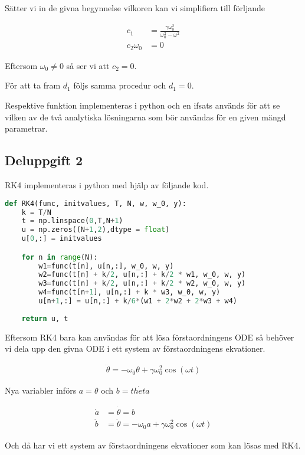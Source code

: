 \documentclass[12pt]{article}
\begin{document}
Sätter vi in de givna begynnelse vilkoren kan vi simplifiera till förljande

\begin{align}
    c_1 &= \frac{\gamma\omega_0^2}{\omega_0^2 - \omega^2}\\
    c_2\omega_0 &= 0
\end{align}

Eftersom $\omega_0 \neq 0$ så ser vi att $c_2=0$.

För att ta fram $d_1$ följs samma procedur och $d_1 = 0$.

Respektive funktion implementeras i python och en ifsats används för att se vilken av de två analytiska lösningarna som bör användas för en given mängd parametrar. 

\subsection{Deluppgift 2}
RK4 implementeras i python med hjälp av följande kod.

\begin{lstlisting}[language=Python]
    def RK4(func, initvalues, T, N, w, w_0, y):
	k = T/N
	t = np.linspace(0,T,N+1)
	u = np.zeros((N+1,2),dtype = float)
	u[0,:] = initvalues

	for n in range(N):
		w1=func(t[n], u[n,:], w_0, w, y)
		w2=func(t[n] + k/2, u[n,:] + k/2 * w1, w_0, w, y)
		w3=func(t[n] + k/2, u[n,:] + k/2 * w2, w_0, w, y)
		w4=func(t[n+1], u[n,:] + k * w3, w_0, w, y)
		u[n+1,:] = u[n,:] + k/6*(w1 + 2*w2 + 2*w3 + w4)
	
	return u, t
\end{lstlisting}

Eftersom RK4 bara kan användas för att lösa förstaordningens ODE så behöver vi dela upp den givna ODE i ett system av förstaordningens ekvationer.

\begin{align}
    \ddot{\theta} = -\omega_0\theta + \gamma\omega_0^2\cos(\omega t)
\end{align}

Nya variabler införs $a = \theta$ och $b = \dot{theta}$

\begin{align}
    \dot{a} &= \dot{\theta} = b\\
    \dot{b} &= \ddot{\theta} = -\omega_0 a + \gamma\omega_0^2\cos(\omega t)
\end{align}

Och då har vi ett system av förstaordningens ekvationer som kan lösas med RK4.
\end{document}
